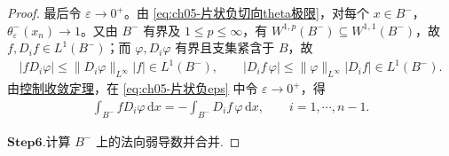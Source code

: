 \documentclass[../../main.tex]{subfiles}
\begin{document}
\begin{proof}
最后令 $\varepsilon\to0^{+}$。由 \eqref{eq:ch05-片状负切向theta极限}，对每个 $x\in B^{-}$，$\theta_{\varepsilon}^{-}(x_n)\to1$。又由 $B^{-}$ 有界及 $1\leqslant p\leqslant\infty$，有 $W^{1,p}(B^{-})\subseteq W^{1,1}(B^{-})$，故 $f,D_if\in L^{1}(B^{-})$；而 $\varphi,D_i\varphi$ 有界且支集紧含于 $B$，故
\begin{align*}
|fD_i\varphi|\leqslant\|D_i\varphi\|_{L^{\infty}}|f|\in L^{1}(B^{-}),\qquad
|D_if\,\varphi|\leqslant\|\varphi\|_{L^{\infty}}|D_if|\in L^{1}(B^{-}).
\end{align*}
由\hyperref[Real Analysis-theorem:控制收敛定理]{控制收敛定理}，在 \eqref{eq:ch05-片状负eps} 中令 $\varepsilon\to0^{+}$，得
\begin{align}
\int_{B^{-}}fD_i\varphi\,\mathrm{d}x
=-\int_{B^{-}}D_if\,\varphi\,\mathrm{d}x,\qquad i=1,\cdots,n-1.
\label{eq:ch05-片状切向-}
\end{align}

\noindent$\mathbf{Step}\bm{6}$.{\heiti 计算 $B^{-}$ 上的法向弱导数并合并.}


\end{proof}
\end{document}
